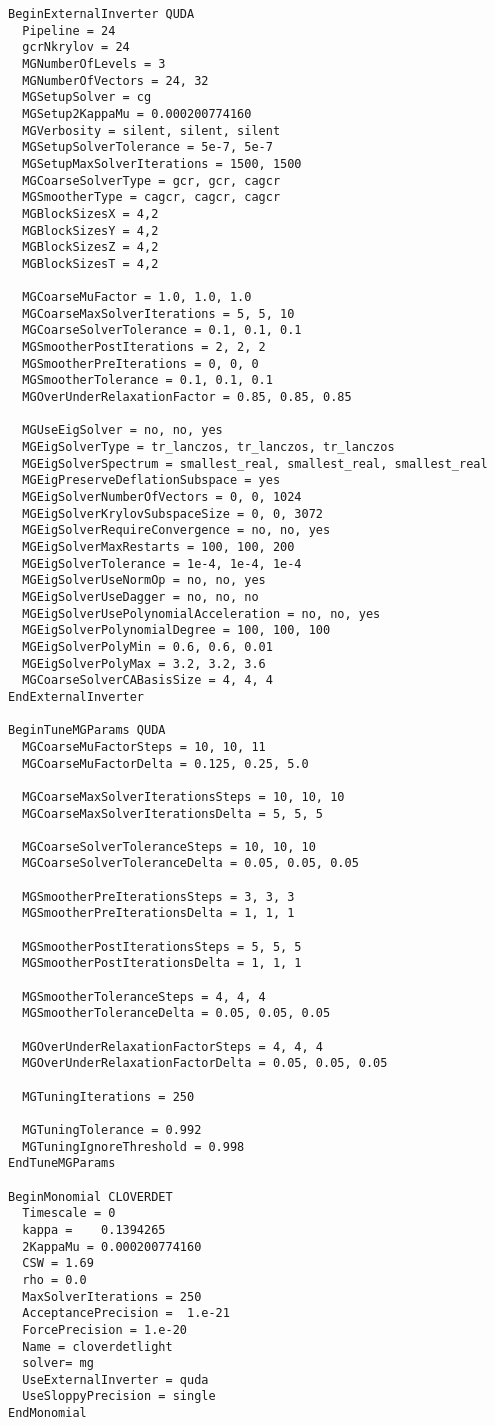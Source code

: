 \begin{verbatim}
BeginExternalInverter QUDA
  Pipeline = 24
  gcrNkrylov = 24
  MGNumberOfLevels = 3
  MGNumberOfVectors = 24, 32
  MGSetupSolver = cg
  MGSetup2KappaMu = 0.000200774160
  MGVerbosity = silent, silent, silent
  MGSetupSolverTolerance = 5e-7, 5e-7
  MGSetupMaxSolverIterations = 1500, 1500
  MGCoarseSolverType = gcr, gcr, cagcr
  MGSmootherType = cagcr, cagcr, cagcr
  MGBlockSizesX = 4,2
  MGBlockSizesY = 4,2
  MGBlockSizesZ = 4,2
  MGBlockSizesT = 4,2
 
  MGCoarseMuFactor = 1.0, 1.0, 1.0
  MGCoarseMaxSolverIterations = 5, 5, 10
  MGCoarseSolverTolerance = 0.1, 0.1, 0.1
  MGSmootherPostIterations = 2, 2, 2
  MGSmootherPreIterations = 0, 0, 0
  MGSmootherTolerance = 0.1, 0.1, 0.1
  MGOverUnderRelaxationFactor = 0.85, 0.85, 0.85  

  MGUseEigSolver = no, no, yes 
  MGEigSolverType = tr_lanczos, tr_lanczos, tr_lanczos
  MGEigSolverSpectrum = smallest_real, smallest_real, smallest_real
  MGEigPreserveDeflationSubspace = yes 
  MGEigSolverNumberOfVectors = 0, 0, 1024
  MGEigSolverKrylovSubspaceSize = 0, 0, 3072
  MGEigSolverRequireConvergence = no, no, yes 
  MGEigSolverMaxRestarts = 100, 100, 200 
  MGEigSolverTolerance = 1e-4, 1e-4, 1e-4
  MGEigSolverUseNormOp = no, no, yes 
  MGEigSolverUseDagger = no, no, no
  MGEigSolverUsePolynomialAcceleration = no, no, yes 
  MGEigSolverPolynomialDegree = 100, 100, 100 
  MGEigSolverPolyMin = 0.6, 0.6, 0.01
  MGEigSolverPolyMax = 3.2, 3.2, 3.6 
  MGCoarseSolverCABasisSize = 4, 4, 4
EndExternalInverter

BeginTuneMGParams QUDA
  MGCoarseMuFactorSteps = 10, 10, 11
  MGCoarseMuFactorDelta = 0.125, 0.25, 5.0

  MGCoarseMaxSolverIterationsSteps = 10, 10, 10
  MGCoarseMaxSolverIterationsDelta = 5, 5, 5

  MGCoarseSolverToleranceSteps = 10, 10, 10
  MGCoarseSolverToleranceDelta = 0.05, 0.05, 0.05

  MGSmootherPreIterationsSteps = 3, 3, 3
  MGSmootherPreIterationsDelta = 1, 1, 1

  MGSmootherPostIterationsSteps = 5, 5, 5
  MGSmootherPostIterationsDelta = 1, 1, 1

  MGSmootherToleranceSteps = 4, 4, 4
  MGSmootherToleranceDelta = 0.05, 0.05, 0.05

  MGOverUnderRelaxationFactorSteps = 4, 4, 4
  MGOverUnderRelaxationFactorDelta = 0.05, 0.05, 0.05

  MGTuningIterations = 250

  MGTuningTolerance = 0.992
  MGTuningIgnoreThreshold = 0.998
EndTuneMGParams

BeginMonomial CLOVERDET
  Timescale = 0
  kappa =    0.1394265
  2KappaMu = 0.000200774160
  CSW = 1.69
  rho = 0.0
  MaxSolverIterations = 250
  AcceptancePrecision =  1.e-21
  ForcePrecision = 1.e-20
  Name = cloverdetlight
  solver= mg
  UseExternalInverter = quda
  UseSloppyPrecision = single
EndMonomial
\end{verbatim}

